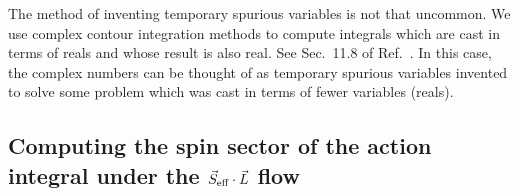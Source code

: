 \hfill \break





\begin{tcolorbox}
The method of inventing temporary spurious variables is not that
uncommon. We use complex contour integration methods to compute integrals
which are cast in terms of reals and whose result is also real.
See Sec.~11.8 of Ref.~\cite{arfken2013mathematical}. 
In this case, the complex numbers can be thought of as temporary spurious
variables invented to solve some problem which was cast in terms of fewer
variables (reals).
\end{tcolorbox}





\subsection{Computing the spin sector of the action integral under the $\vec{S}_{\text{eff}}\cdot \vec{L}$ flow}



